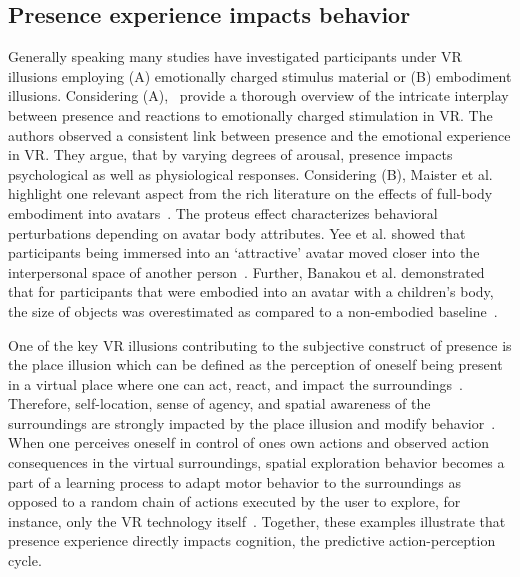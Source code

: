 \subsection{Presence experience impacts behavior}
Generally speaking many studies have investigated participants under VR illusions employing (A) emotionally charged stimulus material or (B) embodiment illusions. Considering (A),~\cite{Diemer2015} provide a thorough overview of the intricate interplay between presence and reactions to emotionally charged stimulation in VR. The authors observed a consistent link between presence and the emotional experience in VR. They argue, that by varying degrees of arousal, presence impacts psychological as well as physiological responses. Considering (B), Maister et al. highlight one relevant aspect from the rich literature on the effects of full-body embodiment into avatars~\cite{Maister2015}. The proteus effect characterizes behavioral perturbations depending on avatar body attributes. Yee et al. showed that participants being immersed into an `attractive' avatar moved closer into the interpersonal space of another person~\cite{Yee2007}. Further, Banakou et al. demonstrated that for participants that were embodied into an avatar with a children's body, the size of objects was overestimated as compared to a non-embodied baseline~\cite{Banakou2013}.

One of the key VR illusions contributing to the subjective construct of presence is the place illusion which can be defined as the perception of oneself being present in a virtual place where one can act, react, and impact the surroundings~\cite{Slater2009}. Therefore, self-location, sense of agency, and spatial awareness of the surroundings are strongly impacted by the place illusion and modify behavior~\cite{Kilteni2012}. When one perceives oneself in control of ones own actions and observed action consequences in the virtual surroundings, spatial exploration behavior becomes a part of a learning process to adapt motor behavior to the surroundings as opposed to a random chain of actions executed by the user to explore, for instance, only the VR technology itself~\cite{Tan2011}. Together, these examples illustrate that presence experience directly impacts cognition, the predictive action-perception cycle.